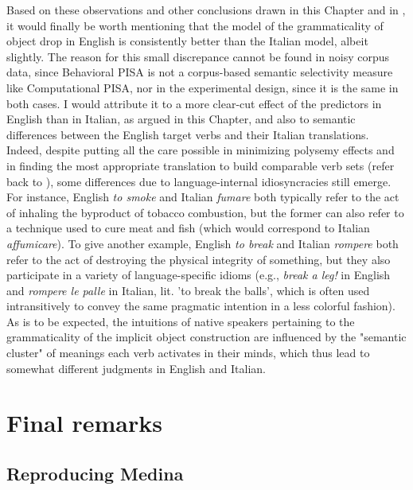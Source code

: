 Based on these observations and other conclusions drawn in this Chapter and in , it would finally be worth mentioning that the model of the grammaticality of object drop in English is consistently better than the Italian model, albeit slightly. The reason for this small discrepance cannot be found in noisy corpus data, since Behavioral PISA is not a corpus-based semantic selectivity measure like Computational PISA, nor in the experimental design, since it is the same in both cases. I would attribute it to a more clear-cut effect of the predictors in English than in Italian, as argued in this Chapter, and also to semantic differences between the English target verbs and their Italian translations. Indeed, despite putting all the care possible in minimizing polysemy effects and in finding the most appropriate translation to build comparable verb sets (refer back to ), some differences due to language-internal idiosyncracies still emerge. For instance, English \textit{to smoke} and Italian \textit{fumare} both typically refer to the act of inhaling the byproduct of tobacco combustion, but the former can also refer to a technique used to cure meat and fish (which would correspond to Italian \textit{affumicare}). To give another example, English \textit{to break} and Italian \textit{rompere} both refer to the act of destroying the physical integrity of something, but they also participate in a variety of language-specific idioms (e.g., \textit{break a leg!} in English and \textit{rompere le palle} in Italian, lit. 'to break the balls', which is often used intransitively to convey the same pragmatic intention in a less colorful fashion). As is to be expected, the intuitions of native speakers pertaining to the grammaticality of the implicit object construction are influenced by the "semantic cluster" of meanings each verb activates in their minds, which thus lead to somewhat different judgments in English and Italian.


\section{Final remarks} 


\subsection{Reproducing Medina} 

